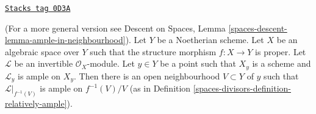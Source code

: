 \begin{lemma}
\label{spaces-divisors-lemma-ample-in-neighbourhood}
\href{https://stacks.math.columbia.edu/tag/0D3A}{\texttt{Stacks tag 0D3A}}

(For a more general version see
Descent on Spaces, Lemma \ref{spaces-descent-lemma-ample-in-neighbourhood}).
Let $Y$ be a Noetherian scheme. Let $X$ be an algebraic space over $Y$
such that the structure morphism $f : X \to Y$ is proper.
Let $\mathcal{L}$ be an invertible $\mathcal{O}_X$-module.
Let $y \in Y$ be a point such that $X_y$ is a scheme and
$\mathcal{L}_y$ is ample on $X_y$.
Then there is an open neighbourhood $V \subset Y$
of $y$ such that $\mathcal{L}|_{f^{-1}(V)}$ is ample on $f^{-1}(V)/V$
(as in Definition \ref{spaces-divisors-definition-relatively-ample}).
\end{lemma}

